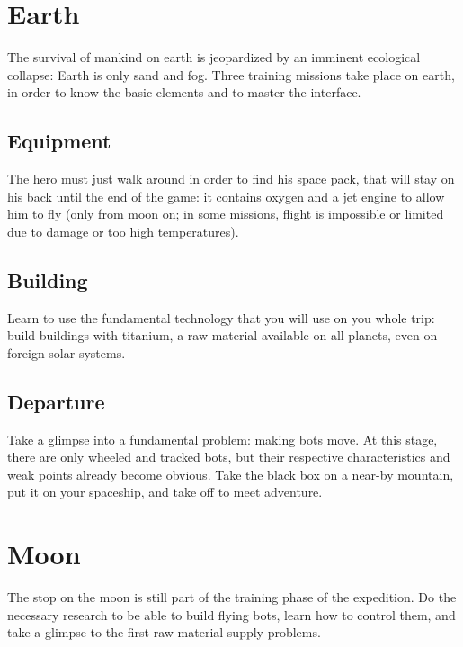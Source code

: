 \newpage
\section{Earth}

The survival of mankind on earth is jeopardized by an imminent ecological collapse: Earth is only sand and fog. Three training missions take place on earth, in order to know the basic elements and to master the interface.


\subsection{Equipment}

The hero must just walk around in order to find his space pack, that will stay on his back until the end of the game: it contains oxygen and a jet engine to allow him to fly (only from moon on; in some missions, flight is impossible or limited due to damage or too high temperatures).


\subsection{Building}

Learn to use the fundamental technology that you will use on you whole trip: build buildings with titanium, a raw material available on all planets, even on foreign solar systems.


\subsection{Departure}

Take a glimpse into a fundamental problem: making bots move. At this stage, there are only wheeled and tracked bots, but their respective characteristics and weak points already become obvious. Take the black box on a near-by mountain, put it on your spaceship, and take off to meet adventure.


\newpage
\section{Moon}

The stop on the moon is still part of the training phase of the expedition. Do the necessary research to be able to build flying bots, learn how to control them, and take a glimpse to the first raw material supply problems.


